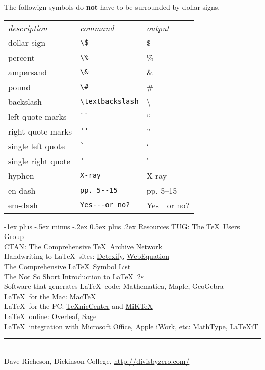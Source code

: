 \documentclass[10pt,landscape]{article}
\makeatletter
\renewcommand{\section}{\@startsection{section}{1}{0mm}%
                                {-1ex plus -.5ex minus -.2ex}%
                                {0.5ex plus .2ex}%
                                {\normalfont\large\bfseries}}
\makeatother
\begin{document}
\begin{multicols}{3}
The followign symbols do \textbf{not} have to be surrounded by dollar signs.

\begin{tabular}{lll}
\emph{description} & \emph{command} & \emph{output}\\
dollar sign & \verb!\$! & \$ \\
percent & \verb!\%! & \% \\
ampersand & \verb!\&! & \& \\
pound & \verb!\#! & \# \\
backslash & \verb!\textbackslash! & \textbackslash \\
left quote marks & \verb!``! & `` \\
right quote marks & \verb!''! & '' \\
single left quote  & \verb!`! & ` \\
single right quote  & \verb!'! & ' \\
hyphen & \verb!X-ray! & X-ray\\
en-dash & \verb!pp. 5--15! & pp. 5--15 \\
em-dash & \verb!Yes---or no?! & Yes---or no? 
\end{tabular}

\section{Resources}
\href{http://www.tug.org/}{TUG: The \TeX\ Users Group}\\
\href{http://www.ctan.org/}{CTAN: The Comprehensive \TeX\ Archive Network}\\
Handwriting-to-\LaTeX\ sites: \href{http://detexify.kirelabs.org/}{Detexify}, \href{http://webdemo.visionobjects.com/equation.html}{WebEquation}\\
\href{ftp://tug.ctan.org/pub/tex-archive/info/symbols/comprehensive/symbols-letter.pdf}{The Comprehensive \LaTeX\ Symbol List}\\ 
\href{http://mirrors.med.harvard.edu/ctan/info/lshort/english/lshort.pdf}{The Not So Short Introduction to \LaTeX\ 2$\varepsilon$}\\
Software that generates \LaTeX\ code: Mathematica, Maple, GeoGebra\\ %
\LaTeX\ for the Mac: \href{http://www.tug.org/mactex/}{Mac\TeX}\\
\LaTeX\ for the PC: \href{http://www.texniccenter.org/}{{\TeX}nicCenter} and \href{http://miktex.org/}{MiK\TeX}\\
\LaTeX\ online:  \href{http://www.overleaf.com/}{Overleaf}, \href{http://www.sagemath.org/}{Sage}\\
\LaTeX\ integration with Microsoft Office, Apple iWork, etc: \href{http://www.dessci.com/en/products/mathtype/}{MathType}, \href{http://www.chachatelier.fr/latexit/}{{\LaTeX}{iT}}
\vfill
\hrule
~\\
Dave Richeson, Dickinson College, \href{http://divisbyzero.com/}{http://divisbyzero.com/}
\end{multicols}
\end{document}
